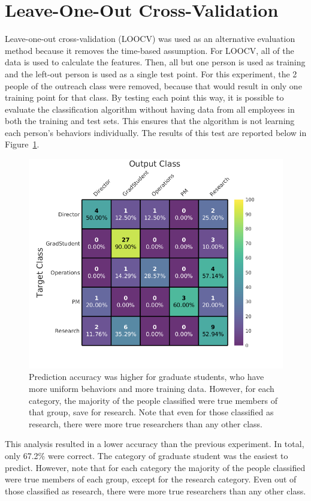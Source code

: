 \documentclass[12pt]{report}
\begin{document}
\section{Leave-One-Out Cross-Validation}
Leave-one-out cross-validation (LOOCV) was used as an alternative evaluation method because it removes the time-based assumption.
For LOOCV, all of the data is used to calculate the features.
Then, all but one person is used as training and the left-out person is used as a single test point.
For this experiment, the 2 people of the outreach class were removed, because that would result in only one training point for that class.
By testing each point this way, it is possible to evaluate the classification algorithm without having data from all employees in both the training and test sets.
This ensures that the algorithm is not learning each person's behaviors individually.
The results of this test are reported below in Figure~\ref{fig:loocv_conf_plot}.
\begin{figure}[t]
    \centering
        \includegraphics[width=.7\columnwidth,trim={0mm 0mm 0mm 0mm},clip]{LOOCV_confusion}
        \vspace{-7pt}
        \caption[Leave-one-out cross-validation results]{Prediction accuracy was higher for graduate students, who have more uniform behaviors and more training data.  However, for each category, the majority of the people classified were true members of that group, save for research.  Note that even for those classified as research, there were more true researchers than any other class.}
        \label{fig:loocv_conf_plot}
\end{figure}

This analysis resulted in a lower accuracy than the previous experiment.
In total, only 67.2\% were correct.
The category of graduate student was the easiest to predict.
However, note that for each category the majority of the people classified were true members of each group, except for the research category.
Even out of those classified as research, there were more true researchers than any other class.
\end{document}
